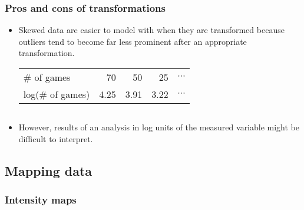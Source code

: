 \documentclass[slidestop,compress,mathserif]{beamer}
\newcommand{\soln}[1]{\textit{#1}}
\begin{document}

\begin{frame}
\frametitle{Pros and cons of transformations}

\begin{itemize}

\item Skewed data are easier to model with when they are transformed because outliers tend to become far less prominent after an appropriate transformation. \\
$\:$ \\
\renewcommand{\arraystretch}{1.5}
\begin{tabular}{l r r r r }
\# of games		&  70 	& 50 		& 25 		 		& $\cdots$ \\
log(\# of games)	& 4.25	& 3.91 	& 3.22 	 	& $\cdots$
\end{tabular}

$\:$ \\

\item However, results of an analysis in log units of the measured variable might be difficult to interpret.

\end{itemize}

\pause


\soln{}

\end{frame}


\subsection{Mapping data}


\begin{frame}
\frametitle{Intensity maps}


\begin{center}
\end{center}


\end{frame}
\end{document}
